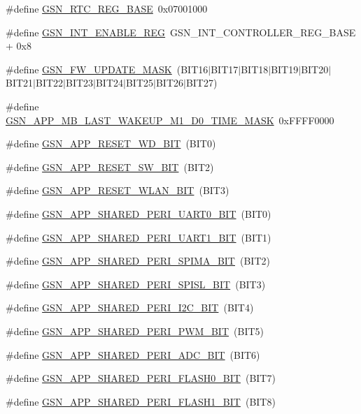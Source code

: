 \begin{DoxyCompactItemize}
\item 
\#define \hyperlink{a00546_ac1f9d101177eec7c996d6fb3a8c174d6}{GSN\_\-RTC\_\-REG\_\-BASE}~0x07001000
\item 
\#define \hyperlink{a00546_a95aab250969f4bb12629690939190800}{GSN\_\-INT\_\-ENABLE\_\-REG}~GSN\_\-INT\_\-CONTROLLER\_\-REG\_\-BASE + 0x8
\item 
\#define \hyperlink{a00546_a4e92a5bdf7d24bec90b6697cb205753c}{GSN\_\-FW\_\-UPDATE\_\-MASK}~(BIT16$|$BIT17$|$BIT18$|$BIT19$|$BIT20$|$BIT21$|$BIT22$|$BIT23$|$BIT24$|$BIT25$|$BIT26$|$BIT27)
\item 
\#define \hyperlink{a00546_a77e5d0f56f8ba4f0646b40cd38bb63e0}{GSN\_\-APP\_\-MB\_\-LAST\_\-WAKEUP\_\-M1\_\-D0\_\-TIME\_\-MASK}~0xFFFF0000
\item 
\#define \hyperlink{a00546_a3ebbfd2b2b19d29677f65951f8042712}{GSN\_\-APP\_\-RESET\_\-WD\_\-BIT}~(BIT0)
\item 
\#define \hyperlink{a00546_a3e4bacbdcb26ce1227894ff80daec6eb}{GSN\_\-APP\_\-RESET\_\-SW\_\-BIT}~(BIT2)
\item 
\#define \hyperlink{a00546_a437582035fe7e9ed3ba4ecd5411cfeef}{GSN\_\-APP\_\-RESET\_\-WLAN\_\-BIT}~(BIT3)
\item 
\#define \hyperlink{a00546_a841fa15129b7ef57ed5be1da965e4f62}{GSN\_\-APP\_\-SHARED\_\-PERI\_\-UART0\_\-BIT}~(BIT0)
\item 
\#define \hyperlink{a00546_a0f847bed02c1da6c9a7306cbaca98a81}{GSN\_\-APP\_\-SHARED\_\-PERI\_\-UART1\_\-BIT}~(BIT1)
\item 
\#define \hyperlink{a00546_a5c3cfe3758522bf325152c0e72fd9622}{GSN\_\-APP\_\-SHARED\_\-PERI\_\-SPIMA\_\-BIT}~(BIT2)
\item 
\#define \hyperlink{a00546_a8a5c843fa6f97d33e7cfcfba970dee88}{GSN\_\-APP\_\-SHARED\_\-PERI\_\-SPISL\_\-BIT}~(BIT3)
\item 
\#define \hyperlink{a00546_a076051e6f0d19e45e8744f9bb5e2db96}{GSN\_\-APP\_\-SHARED\_\-PERI\_\-I2C\_\-BIT}~(BIT4)
\item 
\#define \hyperlink{a00546_ae0ae2a5a4d5d5ed743550467f48e8196}{GSN\_\-APP\_\-SHARED\_\-PERI\_\-PWM\_\-BIT}~(BIT5)
\item 
\#define \hyperlink{a00546_afa951541d31da5083533548e2c00b6b2}{GSN\_\-APP\_\-SHARED\_\-PERI\_\-ADC\_\-BIT}~(BIT6)
\item 
\#define \hyperlink{a00546_a28328764d983da313bc0923f941bf50e}{GSN\_\-APP\_\-SHARED\_\-PERI\_\-FLASH0\_\-BIT}~(BIT7)
\item 
\#define \hyperlink{a00546_a4f97113d1c2093583811a49e940ec4ce}{GSN\_\-APP\_\-SHARED\_\-PERI\_\-FLASH1\_\-BIT}~(BIT8)

\end{DoxyCompactItemize}
